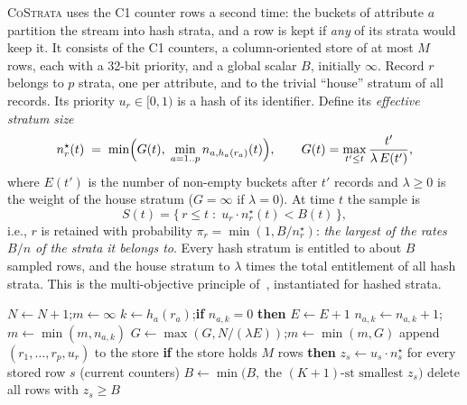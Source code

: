 \documentclass[sigconf]{acmart}
\newcommand{\cs}{\textsc{CoStrata}\xspace}
\newcommand{\nstar}{n^{\star}}
\begin{document}
\cs uses the C1 counter rows a second time: the buckets of attribute $a$ partition the stream into
hash strata, and a row is kept if \emph{any} of its strata would keep it. It consists of the C1
counters, a column-oriented store of at most $M$ rows, each with a 32-bit priority, and a global
scalar $B$, initially $\infty$. Record $r$ belongs to $p$ strata, one per attribute, and to the trivial
``house'' stratum of all records. Its priority $u_r\in[0,1)$ is a hash of its identifier. Define its
\emph{effective stratum size}
\begin{equation}\label{eq:nstar}
  \nstar_r(t) \;=\; \min\Bigl( G(t),\; \min_{a=1..p} n_{a,h_a(r_a)}(t) \Bigr),
  \qquad G(t)=\max_{t'\le t}\frac{t'}{\lambda\,E(t')},
\end{equation}
where $E(t')$ is the number of non-empty buckets after $t'$ records and $\lambda\ge 0$ is the weight of
the house stratum ($G=\infty$ if $\lambda=0$). At time $t$ the sample is
\begin{equation}\label{eq:sample}
  S(t) = \{\, r \le t \;:\; u_r\cdot \nstar_r(t) < B(t) \,\},
\end{equation}
i.e., $r$ is retained with probability $\pi_r=\min(1,B/\nstar_r)$: \emph{the largest of the rates
$B/n$ of the strata it belongs to}. Every hash stratum is entitled to about $B$ sampled rows, and the
house stratum to $\lambda$ times the total entitlement of all hash strata. This is the multi-objective
principle of~\cite{cohen-mo,ting-ats}, instantiated for hashed strata.

\begin{algorithm}[t]
\caption{\cs update and compaction}\label{alg:update}
\small
\begin{algorithmic}[1]
  \State $N\gets N+1$;\quad $m\gets\infty$
     \State $k\gets h_a(r_a)$;\quad \textbf{if} $n_{a,k}=0$ \textbf{then} $E\gets E+1$
     \State $n_{a,k}\gets n_{a,k}+1$;\quad $m\gets\min(m,n_{a,k})$
  \EndFor
  \State $G\gets\max(G, N/(\lambda E))$;\quad $m\gets\min(m,G)$
     \State append $(r_1,\dots,r_p,u_r)$ to the store
     \State \textbf{if} the store holds $M$ rows \textbf{then} 
  \EndIf
\EndProcedure
{}
  \State $z_s\gets u_s\cdot\nstar_s$ for every stored row $s$ (current counters)
  \State $B\gets\min\bigl(B,\ \text{the } (K{+}1)\text{-st smallest } z_s\bigr)$ 
  \State delete all rows with $z_s\ge B$
\EndProcedure
\end{algorithmic}
\end{algorithm}
\end{document}
